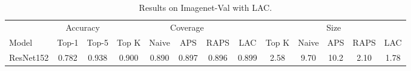 \begin{table}[t]
    \centering
    \small
    \begin{tabular}{lcccccccccccc}
    \toprule
     & \multicolumn{2}{c}{Accuracy}  & \multicolumn{5}{c}{Coverage} & \multicolumn{5}{c}{Size} \\ 
    \cmidrule(r){2-3}  \cmidrule(r){4-8}  \cmidrule(r){9-13}
    Model & Top-1 & Top-5 & Top K & Naive & APS & RAPS & LAC & Top K & Naive & APS & RAPS & LAC \\ 
    \midrule
     ResNet152 &  0.782 &  0.938 & 0.900 & 0.890 & 0.897 & 0.896 & 0.899 & 2.58 & 9.70 & 10.2 & 2.10 & 1.78 \\ 
    \bottomrule
    \end{tabular}
    \caption{Results on Imagenet-Val with LAC.}
    \label{table:imagenet-val-lei-wasserman}
\end{table}
    